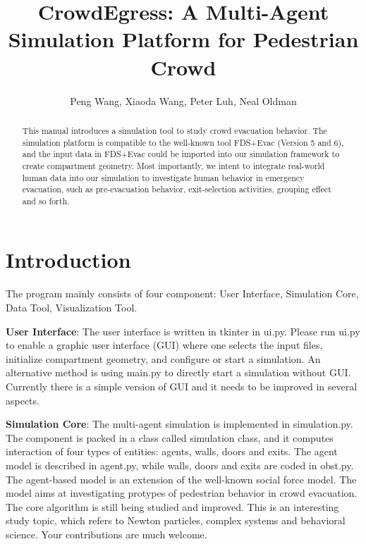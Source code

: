 \documentclass[english]{article}
\begin{document}
\title{CrowdEgress: A Multi-Agent Simulation Platform for Pedestrian Crowd}

\maketitle
\author{Peng Wang, Xiaoda Wang, Peter Luh, Neal Oldman}

\begin{abstract}
This manual introduces a simulation tool to study crowd evacuation
behavior. The simulation platform is compatible to the well-known
tool FDS+Evac (Version 5 and 6), and the input data in FDS+Evac could be imported into our simulation framework to create compartment geometry. Most importantly, we intent to integrate real-world human data into our simulation to investigate human behavior in emergency evacuation, such as pre-evacuation behavior, exit-selection activities, grouping effect and so forth.  
\end{abstract}

\section{Introduction}

The program mainly consists of four component: User Interface, Simulation
Core, Data Tool, Visualization Tool.  

\textbf{User Interface}: The user interface is written in tkinter
in ui.py. Please run ui.py to enable a graphic user interface (GUI)
where one selects the input files, initialize compartment geometry,
and configure or start a simulation. An alternative method is using
main.py to directly start a simulation without GUI. Currently
there is a simple version of GUI and it needs to be improved in several
aspects.

\textbf{Simulation Core}: The multi-agent simulation is implemented
in simulation.py. The component is packed in a class called simulation
class, and it computes interaction of four types of entities: agents,
walls, doors and exits. The agent model is described in agent.py,
while walls, doors and exits are coded in obst.py. The agent-based
model is an extension of the well-known social force model\cite{Helbing00,Helbing02,Helbing95}.
The model aims at investigating protypes of pedestrian behavior in
crowd evacuation. The core algorithm is still being studied and improved.
This is an interesting study topic, which refers to Newton particles,
complex systems and behavioral science. Your contributions are much
welcome.
\end{document}
